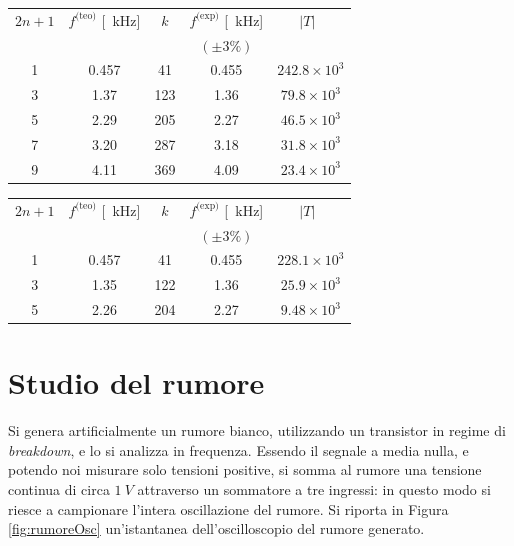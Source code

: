 \documentclass[10pt,oneside,a4paper]{article}
\begin{document}
\begin{multicols}{2}
\begin{table}
\label{tab:armoniche_quadra}
\centering
\begin{tabular}{c|c|c|c|c}
$2n+1$ & $f^\text{(teo)}$ [\SI{}{\kilo\Hz}] & $k$ & $f^\text{(exp)}$ [\SI{}{\kilo\Hz}] & $\vert T \vert$\ \\
 & & & $(\pm 3\%)$ &   \\ 
\hline		
1 		&	0.457	& 	41		&	0.455 	& 	$242.8\times10^3$	\\
3		&	1.37		& 	123		&	1.36		& 	$79.8\times10^3$\\
5		&	2.29		& 	205		&	2.27		& 	$46.5\times10^3$\\
7		&	3.20		& 	287		&	3.18		& 	$31.8\times10^3$\\
9 		&	4.11		& 	369		&	4.09		& 	$23.4\times10^3$\\
\hline
\end{tabular}
\end{table}

\begin{table}
\label{tab:armoniche_quadra_filtro}
\centering
\begin{tabular}{c|c|c|c|c}
$2n+1$ & $f^\text{(teo)}$ [\SI{}{\kilo\Hz}] & $k$ & $f^\text{(exp)}$ [\SI{}{\kilo\Hz}] & $\vert T \vert$\ \\
 & & & $(\pm 3\%)$ &   \\ 
\hline		
1 		&	0.457	& 	41		&	0.455 	& 	$228.1\times10^3$	\\
3		&	1.35		& 	122		&	1.36		& 	$25.9\times10^3$\\
5		&	2.26		& 	204		&	2.27		& 	$9.48\times10^3$\\
\hline
\end{tabular}
\end{table}




\section{Studio del rumore}
Si genera artificialmente un rumore bianco, utilizzando un transistor in regime di \emph{breakdown}, e lo si analizza in frequenza. Essendo il segnale a media nulla, e potendo noi misurare solo tensioni positive, si somma al rumore una tensione continua di circa $\SI{1}{V}$ attraverso un sommatore a tre ingressi: in questo modo si riesce a campionare l'intera oscillazione del rumore. Si riporta in Figura \ref{fig:rumoreOsc} un'istantanea dell'oscilloscopio del rumore generato.


\end{multicols}
\end{document}
